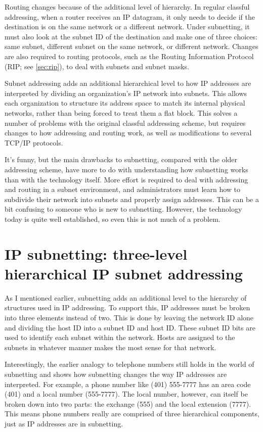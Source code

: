 Routing changes because of the additional level of hierarchy. In regular
classful addressing, when a router receives an IP datagram, it only
needs to decide if the destination is on the same network or a different
network. Under subnetting, it must also look at the subnet ID of the
destination and make one of three choices: same subnet, different subnet
on the same network, or different network.
Changes are also required to routing protocols, such as the Routing Information Protocol (RIP; see \vref{sec:rip}), to deal with subnets and subnet masks.


\begin{keyconcept}
Subnet addressing adds an additional hierarchical level to how IP addresses are interpreted by dividing an organization's IP network into subnets.
This allows each organization to structure its address space to match its internal physical networks, rather than being forced to treat them a flat block.
This solves a number of problems with the original classful addressing scheme, but requires changes to how addressing and routing work, as well as modifications to several TCP/IP protocols.
\end{keyconcept}

It's funny, but the main drawbacks to subnetting, compared with the
older addressing scheme, have more to do with understanding how
subnetting works than with the technology itself. More effort is
required to deal with addressing and routing in a subnet environment,
and administrators must learn how to subdivide their network into
subnets and properly assign addresses. This can be a bit confusing to
someone who is new to subnetting. However, the technology today is quite
well established, so even this is not much of a problem.


\section{IP subnetting: three-level hierarchical IP subnet addressing}

As I mentioned earlier, subnetting adds an additional level to the hierarchy
of structures used in IP addressing. To support this, IP addresses must
be broken into three elements instead of two. This is done by leaving
the network ID alone and dividing the host ID into a subnet ID and host
ID. These subnet ID bits are used to identify each subnet within the
network. Hosts are assigned to the subnets in whatever manner makes the
most sense for that network.

Interestingly, the earlier analogy to telephone numbers still holds in
the world of subnetting and shows how subnetting changes the way IP
addresses are interpreted. For example, a phone number like (401)
555-7777 has an area code (401) and a local number (555-7777). The local
number, however, can itself be broken down into two parts: the exchange
(555) and the local extension (7777). This means phone numbers really
are comprised of three hierarchical components, just as IP addresses are
in subnetting.


